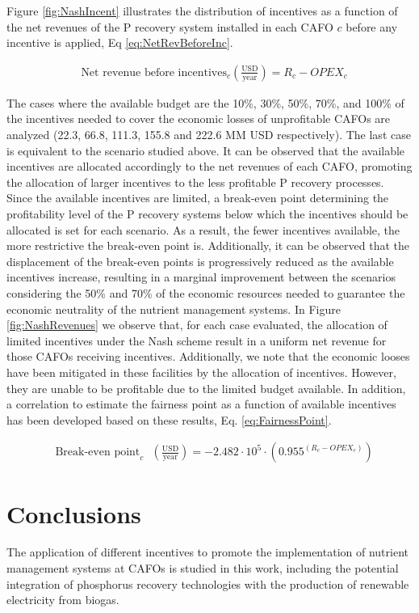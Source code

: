 \begin{refsection}[referencesCh5]
Figure \ref{fig:NashIncent} illustrates the distribution of incentives as a function of the net revenues of the P recovery system installed in each CAFO $c$ before any incentive is applied, Eq \ref{eq:NetRevBeforeInc}.

\begin{align}
& \text{Net revenue before incentives}_{c} \left(\frac{\text{USD}}{\text{year}}\right) = R_{c} - OPEX_{c} \label{eq:NetRevBeforeInc}
\end{align}

The cases where the available budget are the 10\%, 30\%, 50\%, 70\%, and 100\% of the incentives needed to cover the economic losses of unprofitable CAFOs are analyzed (22.3, 66.8, 111.3, 155.8 and 222.6 MM USD respectively). The last case is equivalent to the scenario studied above. It can be observed that the available incentives are allocated accordingly to the net revenues of each CAFO, promoting the allocation of larger incentives to the less profitable P recovery processes. Since the available incentives are limited, a break-even point determining the profitability level of the P recovery systems below which the incentives should be allocated is set for each scenario. As a result, the fewer incentives available, the more restrictive the break-even point is. Additionally, it can be observed that the displacement of the break-even points is progressively reduced as the available incentives increase, resulting in a marginal improvement between the scenarios considering the 50\% and 70\% of the economic resources needed to guarantee the economic neutrality of the nutrient management systems. In Figure \ref{fig:NashRevenues} we observe that, for each case evaluated, the allocation of limited incentives under the Nash scheme result in a uniform net revenue for those CAFOs receiving incentives. Additionally, we note that the economic looses have been mitigated in these facilities by the allocation of incentives. However, they are unable to be profitable due to the limited budget available. In addition, a correlation to estimate the fairness point as a function of available incentives has been developed based on these results, Eq. \ref{eq:FairnessPoint}.

\begin{align}
& \text{Break-even point}_c \ \ \ \left(\frac{\text{USD}}{\text{year}}\right) = -2.482\cdot10^{5} \cdot \left(0.955^{\left(R_{c} - OPEX_{c}\right)}\right) \label{eq:FairnessPoint}
\end{align}

\section{Conclusions}
The application of different incentives to promote the implementation of nutrient management systems at CAFOs is studied in this work, including the potential integration of phosphorus recovery technologies with the production of renewable electricity from biogas. 


\end{refsection}

